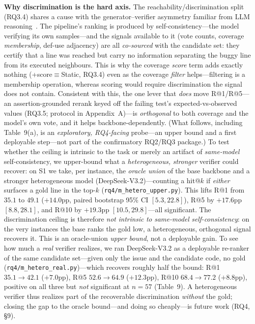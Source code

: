 \documentclass[11pt]{article}
\newcommand{\code}[1]{\texttt{#1}}
\begin{document}
\smallskip\noindent\textbf{Why discrimination is the hard axis.} The reachability/discrimination split (RQ3.4) shares a cause with the generator--verifier asymmetry familiar from LLM reasoning~\citep{cannot_self_correct,verifiers}. The pipeline's ranking is produced by self-consistency---the model verifying its own samples---and the signals available to it (vote counts, coverage \emph{membership}, def-use adjacency) are all \emph{co-sourced} with the candidate set: they certify that a line was reached but carry no information separating the buggy line from its executed neighbours. This is why the coverage \emph{score} term adds exactly nothing (+score$\equiv$Static, RQ3.4) even as the coverage \emph{filter} helps---filtering is a membership operation, whereas scoring would require discrimination the signal does not contain. Consistent with this, the one lever that \emph{does} move R@1/R@5---an assertion-grounded rerank keyed off the failing test's expected-vs-observed values (RQ3.5; protocol in Appendix~A)---is \emph{orthogonal} to both coverage and the model's own vote, and it helps backbone-dependently. (What follows, including Table~9(a), is an \emph{exploratory, RQ4-facing} probe---an upper bound and a first deployable step---not part of the confirmatory RQ2/RQ3 package.) To test whether the ceiling is intrinsic to the task or merely an artifact of \emph{same-model} self-consistency, we upper-bound what a \emph{heterogeneous, stronger} verifier could recover: on S1 we take, per instance, the \emph{oracle union} of the base backbone and a stronger heterogeneous model (DeepSeek-V3.2)---counting a hit@$k$ if \emph{either} surfaces a gold line in the top-$k$ (\code{rq4/m\_hetero\_upper.py}). This lifts R@1 from $35.1$ to $49.1$ ($+14.0$pp, paired bootstrap 95\% CI $[5.3,22.8]$), R@5 by $+17.6$pp $[8.8,28.1]$, and R@10 by $+19.3$pp $[10.5,29.8]$---all significant. The discrimination ceiling is therefore \emph{not intrinsic to same-model self-consistency}: on the very instances the base ranks the gold low, a heterogeneous, orthogonal signal recovers it. This is an oracle-union \emph{upper bound}, not a deployable gain. To see how much a \emph{real} verifier realizes, we ran DeepSeek-V3.2 as a deployable re-ranker of the same candidate set---given only the issue and the candidate code, no gold (\code{rq4/m\_hetero\_real.py})---which recovers roughly half the bound: R@1 $35.1\rightarrow42.1$ ($+7.0$pp), R@5 $52.6\rightarrow64.9$ ($+12.3$pp), R@10 $68.4\rightarrow77.2$ ($+8.8$pp), positive on all three but \emph{not} significant at $n{=}57$ (Table~9). A heterogeneous verifier thus realizes part of the recoverable discrimination \emph{without} the gold; closing the gap to the oracle bound---and doing so cheaply---is future work (RQ4, \S9).
\end{document}
